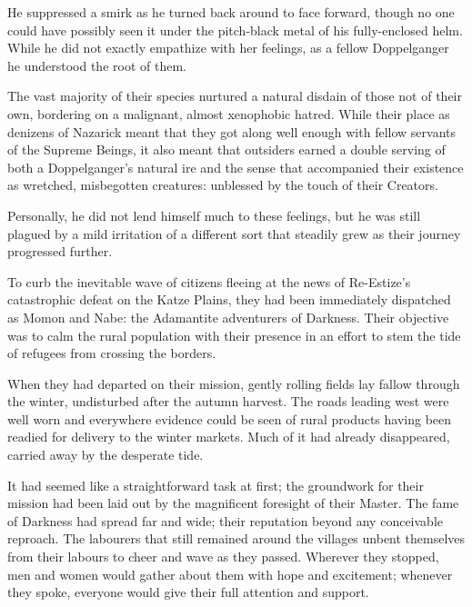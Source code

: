  

He suppressed a smirk as he turned back around to face forward, though no one could have possibly seen it under the pitch-black metal of his fully-enclosed helm. While he did not exactly empathize with her feelings, as a fellow Doppelganger he understood the root of them.

 

The vast majority of their species nurtured a natural disdain of those not of their own, bordering on a malignant, almost xenophobic hatred. While their place as denizens of Nazarick meant that they got along well enough with fellow servants of the Supreme Beings, it also meant that outsiders earned a double serving of both a Doppelganger's natural ire and the sense that accompanied their existence as wretched, misbegotten creatures: unblessed by the touch of their Creators.

 

Personally, he did not lend himself much to these feelings, but he was still plagued by a mild irritation of a different sort that steadily grew as their journey progressed further.

 

To curb the inevitable wave of citizens fleeing at the news of Re-Estize’s catastrophic defeat on the Katze Plains, they had been immediately dispatched as Momon and Nabe: the Adamantite adventurers of Darkness. Their objective was to calm the rural population with their presence in an effort to stem the tide of refugees from crossing the borders.

 

When they had departed on their mission, gently rolling fields lay fallow through the winter, undisturbed after the autumn harvest. The roads leading west were well worn and everywhere evidence could be seen of rural products having been readied for delivery to the winter markets. Much of it had already disappeared, carried away by the desperate tide.

 

It had seemed like a straightforward task at first; the groundwork for their mission had been laid out by the magnificent foresight of their Master. The fame of Darkness had spread far and wide; their reputation beyond any conceivable reproach. The labourers that still remained around the villages unbent themselves from their labours to cheer and wave as they passed. Wherever they stopped, men and women would gather about them with hope and excitement; whenever they spoke, everyone would give their full attention and support.

